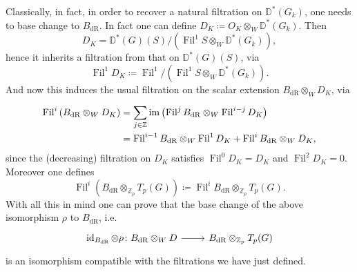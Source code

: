 \begin{rem}[]
	Classically, in fact, in order to recover a natural filtration on $\mathbb{D}^*(G_k)$,
	one needs to base change to $B_{\mathrm{dR}}$.
	In fact one can define $D_{K} \coloneqq O_K \otimes_W \mathbb{D}^*(G_k)$.
	Then 
	\begin{equation*}
		D_K = \mathbb{D}^*(G)(S)/\left( \operatorname{Fil}^1S \otimes_W \mathbb{D}^*(G_k)\right)
	,\end{equation*}
	hence it inherits a filtration from that on $\mathbb{D}^*(G)(S)$, via
	\begin{equation*}
	\operatorname{Fil}^1 D_K \coloneqq 
	\operatorname{Fil}^1 / \left( \operatorname{Fil}^1S \otimes_W \mathbb{D}^*(G_k) \right)
	.\end{equation*}
	And now this induces the usual filtration on the scalar extension
	$B_{\mathrm{dR}} \otimes_{W} D_K$, via 
	\begin{align*}
		\operatorname{Fil}^i \left( B_{\mathrm{dR}} \otimes_{W} D_K \right) &=
		\sum_{j \in \mathbb{Z} }^{  } \operatorname{im} \left( 
		\operatorname{Fil}^j B_{\mathrm{dR}} \otimes_{W} \operatorname{Fil}^{i-j} D_K \right) \\
		&=
		\operatorname{Fil}^{i-1} B_{\mathrm{dR}} \otimes_{W} \operatorname{Fil}^1 D_K +
		\operatorname{Fil}^{i} B_{\mathrm{dR}} \otimes_{W} D_K
	,\end{align*}
	since the (decreasing) filtration on $D_K$ satisfies
	$\operatorname{Fil}^0 D_K = D_K$ and $\operatorname{Fil}^2 D_K = 0$.
	Moreover one defines
	\begin{equation*}
		\operatorname{Fil}^i \left( B_{\mathrm{dR}} \otimes_{\mathbb{Z}_{p}} T_p(G) \right) \coloneqq
		\operatorname{Fil}^i B_{\mathrm{dR}} \otimes_{\mathbb{Z}_{p}} T_p(G)
	.\end{equation*}
	With all this in mind one can prove that the base change of the
	above isomorphism $\rho$ to $B_{\mathrm{dR}}$, i.e.
	\begin{equation*}
	\begin{tikzcd}[row sep = 0ex
		,/tikz/column 1/.append style={anchor=base east}
		,/tikz/column 2/.append style={anchor=base west}]
		\id_{ B_{\mathrm{dR}} } \otimes \rho\colon 
		B_{\mathrm{dR}} \otimes_W D \arrow[r, "", rightarrow] &
		B_{\mathrm{dR}} \otimes_{\mathbb{Z}_{p}} T_p(G)
	\end{tikzcd}
	\end{equation*} 
	is an isomorphism compatible with the filtrations we have just defined.
\end{rem}
